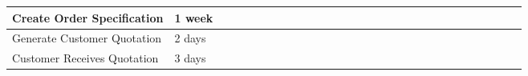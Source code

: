 \begin{table}[!h]
{\begin{tabular}{|l|l|l|l|l|l|l|l|l|l|l|l|l|l|l|l|l|l|l|l|l|l|l|l|l|l|l|l|l|}
            Create Order Specification       & 1 week  &                          &                          &                          &                          &                          &                          &                          &                          &                          & \cellcolor[HTML]{FD6864} & \cellcolor[HTML]{FD6864} &                          &                          &                          &                          &                          &                          &                          &                          &                          &                          &                          &                          &                          &                          &                          &                          \\ \hline
            Generate Customer Quotation      & 2 days  &                          &                          &                          &                          &                          &                          &                          &                          &                          &                          &                          & \cellcolor[HTML]{FD6864} & \cellcolor[HTML]{FD6864} &                          &                          &                          &                          &                          &                          &                          &                          &                          &                          &                          &                          &                          &                          \\ \hline
            Customer Receives Quotation      & 3 days  &                          &                          &                          &                          &                          &                          &                          &                          &                          &                          &                          &                          &                          & \cellcolor[HTML]{FD6864} & \cellcolor[HTML]{FD6864} &                          &                          &                          &                          &                          &                          &                          &                          &                          &                          &                          &                          \\ \hline

\end{tabular}}
\end{table}
